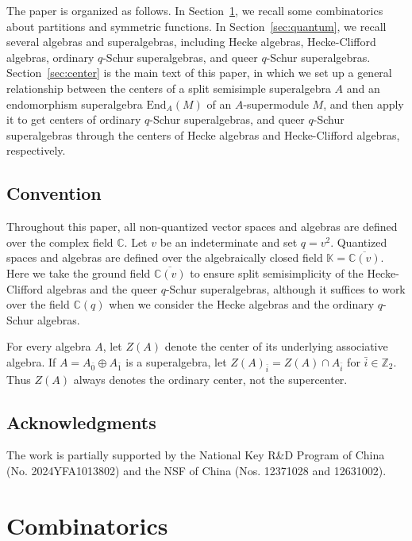 \documentclass[11pt]{amsart}
\numberwithin{equation}{section}
\theoremstyle{plain}
\theoremstyle{definition}
\theoremstyle{remark}
\begin{document}
The paper is organized as follows. In Section~\ref{sec:comb}, we recall some combinatorics about partitions and symmetric functions. In Section~\ref{sec:quantum}, we recall several algebras and superalgebras, including Hecke algebras, Hecke-Clifford algebras, ordinary $q$-Schur superalgebras, and queer $q$-Schur superalgebras. Section~\ref{sec:center} is the main text of this paper, in which we set up a general relationship between the centers of a split semisimple superalgebra $A$ and an endomorphism superalgebra $\mathrm{End}_A(M)$ of an $A$-supermodule $M$, and then apply it to get centers of ordinary $q$-Schur superalgebras, and queer $q$-Schur superalgebras through the centers of Hecke algebras and Hecke-Clifford algebras, respectively. 


\subsection*{Convention}
Throughout this paper, all non-quantized vector spaces and algebras are defined
over the complex field $\mathbb C$. Let $v$ be an indeterminate and set $q=v^2$. Quantized spaces and algebras are defined over the algebraically closed field $\mathbb{K}=\overline{\mathbb{C}(v)}$. Here we take the ground field $\overline{\mathbb{C}(v)}$ to ensure split semisimplicity of the Hecke-Clifford algebras and the queer $q$-Schur superalgebras, although it suffices to work over the field $\mathbb{C}(q)$ when we consider the Hecke algebras and the ordinary $q$-Schur algebras.

For every algebra $A$, let $Z(A)$ denote the center of its underlying
associative algebra. If $A=A_{\bar0}\oplus A_{\bar1}$ is a
superalgebra, let $Z(A)_{\bar i}=Z(A)\cap A_{\bar i}$ for
$\bar i\in\mathbb Z_2$. Thus $Z(A)$ always denotes the ordinary
center, not the supercenter.



\subsection*{Acknowledgments}
The work is partially supported by the National Key R\&D Program of China (No. 2024YFA1013802) and the NSF of China (Nos. 12371028 and 12631002).



\section{Combinatorics} \label{sec:comb}
\end{document}
